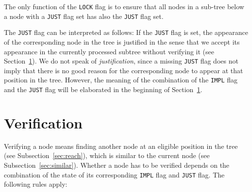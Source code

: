 \documentclass[british]{article}
\newcommand\prv{bc}
\newcommand\m[1]{\texttt{#1}}
\begin{document}
The only function of the \texttt{LOCK} flag is to ensure that all nodes in a
sub-tree below a node with a \texttt{JUST} flag set has also the \texttt{JUST}
flag set.\newline

The \texttt{JUST} flag can be interpreted as follows: If the
\texttt{JUST} flag is set, the appearance of the corresponding node in the tree
is justified in the sense that we accept its appearance in the currently
processed subtree without verifying it (see Section~\ref{sec:verify}). We do not
speak of \emph{justification}, since a missing \texttt{JUST} flag does not imply
that there is no good reason for the corresponding node to appear at that
position in the tree. However, the meaning of the combination of the
\texttt{IMPL} flag and the \texttt{JUST} flag will be elaborated in the
beginning of Section~\ref{sec:verify}.


\pagebreak{}

\section{Verification}\label{sec:verify}

\textcolor{dartmouthgreen}{Verifying a node means finding another node at an
eligible position in the tree (see Subsection~\ref{sec:reach}), which is similar
to the current node (see Subsection~\ref{sec:similar})}.  Whether a node has to
be verified depends on the combination of the state of its corresponding
\texttt{IMPL} flag and \texttt{JUST} flag. The following rules apply:
\end{document}
